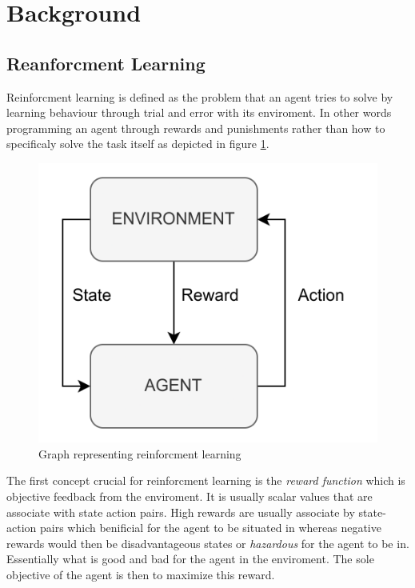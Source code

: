 \section{Background}

\subsection{Reanforcment Learning}

Reinforcment learning is defined as the problem that an agent tries to solve by learning behaviour through trial and error with its enviroment. In other words programming an agent through rewards and punishments rather than how to specificaly solve the task itself\cite{kaelbling1996reinforcement} as depicted in figure \ref{figRL}.
\begin{figure}[H]
    \centering
    \includegraphics [scale = 0.2]{Images/RL_graph.png}
    \caption{Graph representing reinforcment learning}
    \label{figRL}
\end{figure}
The first concept crucial for reinforcment learning is the \textit{reward function} which is objective feedback from the enviroment. It is usually scalar values that are associate with state action pairs. High rewards are usually associate by state-action pairs which benificial for the agent to be situated in whereas negative rewards would then be disadvantageous states or \textit{hazardous} for the agent to be in. Essentially what is good and bad for the agent in the enviroment. The sole objective of the agent is then to maximize this reward\cite{sutton1999reinforcement}.

